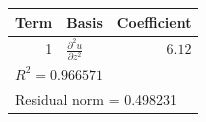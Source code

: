 \begin{tabular}{r l r}
\toprule
Term & Basis & Coefficient \\
\midrule
1 & $\frac{\partial^{2} u}{\partial z^{2}}$ & $6.12$ \\
\midrule
\multicolumn{3}{l}{$R^{2} = 0.966571$} \\
\multicolumn{3}{l}{Residual norm = 0.498231} \\
\bottomrule
\end{tabular}